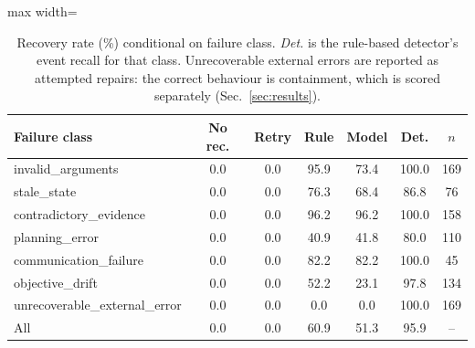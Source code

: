 \begin{table}[t]
\centering\small
\caption{Recovery rate (\%) conditional on failure class. \emph{Det.} is the
rule-based detector's event recall for that class. Unrecoverable external errors
are reported as attempted repairs: the correct behaviour is containment, which is
scored separately (Sec.~\ref{sec:results}).}
\label{tab:bytype}
\begin{adjustbox}{max width=\textwidth}
\begin{tabular}{@{}lcccccc@{}}
\toprule
Failure class & No rec. & Retry & Rule & Model & Det. & $n$ \\
\midrule
invalid\_arguments & 0.0 & 0.0 & 95.9 & 73.4 & 100.0 & 169 \\
stale\_state & 0.0 & 0.0 & 76.3 & 68.4 & 86.8 & 76 \\
contradictory\_evidence & 0.0 & 0.0 & 96.2 & 96.2 & 100.0 & 158 \\
planning\_error & 0.0 & 0.0 & 40.9 & 41.8 & 80.0 & 110 \\
communication\_failure & 0.0 & 0.0 & 82.2 & 82.2 & 100.0 & 45 \\
objective\_drift & 0.0 & 0.0 & 52.2 & 23.1 & 97.8 & 134 \\
unrecoverable\_external\_error & 0.0 & 0.0 & 0.0 & 0.0 & 100.0 & 169 \\
\midrule
All & 0.0 & 0.0 & 60.9 & 51.3 & 95.9 & -- \\
\bottomrule
\end{tabular}
\end{adjustbox}
\end{table}
